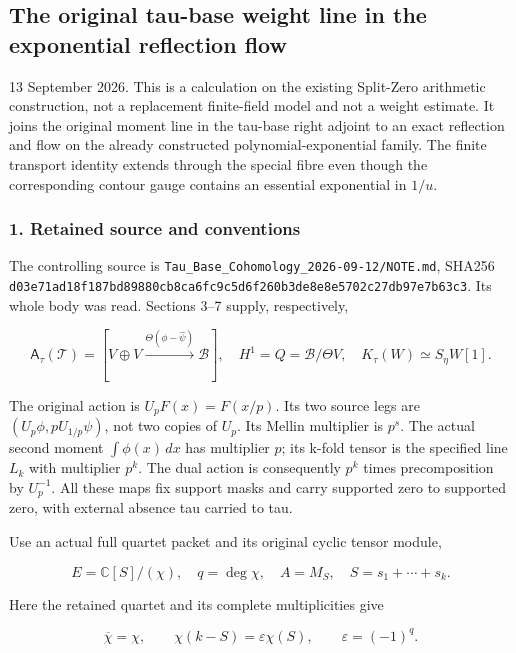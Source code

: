 \subsection{The original tau-base weight line in the exponential reflection flow}\label{endpoint-f1_reflection--the-original-tau-base-weight-line-in-the-exponential-reflection-flow}

13 September 2026. This is a calculation on the existing Split-Zero arithmetic construction, not a replacement finite-field model and not a weight estimate. It joins the original moment line in the tau-base right adjoint to an exact reflection and flow on the already constructed polynomial-exponential family. The finite transport identity extends through the special fibre even though the corresponding contour gauge contains an essential exponential in \(1/u\).

\subsubsection{1. Retained source and conventions}\label{endpoint-f1_reflection--retained-source-and-conventions}

The controlling source is \nolinkurl{Tau_Base_Cohomology_2026-09-12/NOTE.md}, SHA256 \nolinkurl{d03e71ad18f187bd89880cb8ca6fc9c5d6f260b3de8e8e5702c27db97e7b63c3}. Its whole body was read. Sections 3--7 supply, respectively,

\[
\mathsf A_\tau(\mathcal T)
=[V\oplus V\xrightarrow{\Theta(\phi-\widehat\psi)}\mathscr B],
\quad H^1=Q=\mathscr B/\Theta V,
\quad K_\tau(W)\simeq S_\eta W[1].
\tag{RW1}
\]

The original action is \(U_p F(x)=F(x/p)\). Its two source legs are \((U_p\phi,pU_{1/p}\psi)\), not two copies of \(U_p\). Its Mellin multiplier is \(p^s\). The actual second moment \(\int\phi(x)\,dx\) has multiplier \(p\); its k-fold tensor is the specified line \(L_k\) with multiplier \(p^k\). The dual action is consequently \(p^k\) times precomposition by \(U_p^{-1}\). All these maps fix support masks and carry supported zero to supported zero, with external absence tau carried to tau.

Use an actual full quartet packet and its original cyclic tensor module,

\[
E=\mathbb C[S]/(\chi),\quad q=\deg\chi,\quad A=M_S,
\quad S=s_1+\cdots+s_k.
\tag{RW2}
\]

Here the retained quartet and its complete multiplicities give

\[
\overline\chi=\chi,\qquad
\chi(k-S)=\varepsilon\chi(S),\qquad\varepsilon=(-1)^q.
\tag{RW3}
\]

